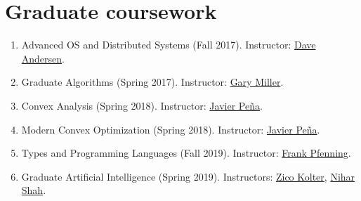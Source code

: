 \documentclass[10PT,letter]{article}
\newcommand{\numbox}[1]{} %
\begin{document}
    \section*{\numbox{7}\bfseries\textcolor{titlecol}{\sffamily Graduate coursework}}
        \begin{enumerate}[itemsep=.5mm]
            \item Advanced OS and Distributed Systems (Fall 2017). Instructor: \href{http://www.cs.cmu.edu/~dga/}{Dave Andersen}.
            \item Graduate Algorithms (Spring 2017). Instructor: \href{http://www.cs.cmu.edu/~glmiller/}{Gary Miller}.
            \item Convex Analysis (Spring 2018). Instructor: \href{https://www.cmu.edu/tepper/faculty-and-research/faculty-by-area/profiles/pena-javier.html}{Javier Peña}.
            \item Modern Convex Optimization (Spring 2018). Instructor: \href{https://www.cmu.edu/tepper/faculty-and-research/faculty-by-area/profiles/pena-javier.html}{Javier Peña}.
            \item Types and Programming Languages (Fall 2019). Instructor: \href{http://www.cs.cmu.edu/~fp/}{Frank Pfenning}.
            \item  Graduate Artificial Intelligence (Spring 2019). Instructors: \href{http://zicokolter.com/}{Zico Kolter}, \href{https://www.cs.cmu.edu/~nihars/}{Nihar Shah}.
        \end{enumerate}
\end{document}

